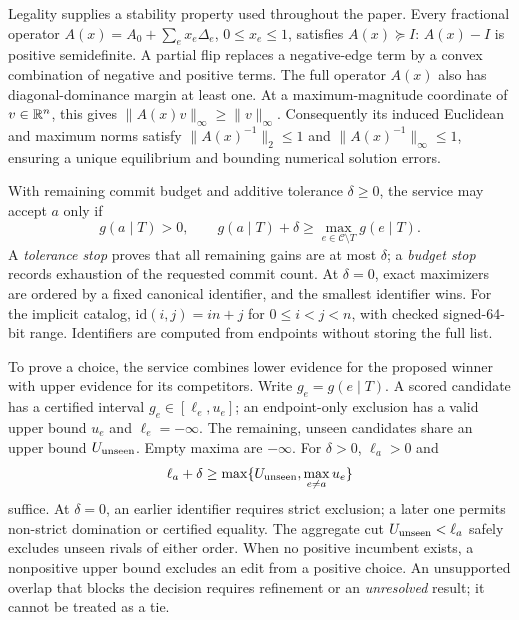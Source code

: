 Legality supplies a stability property used throughout the paper. Every fractional operator $A(x)=A_0+\sum_e x_e\Delta_e$, $0\le x_e\le1$, satisfies $A(x)\succeq I$: $A(x)-I$ is positive semidefinite. A partial flip replaces a negative-edge term by a convex combination of negative and positive terms. The full operator $A(x)$ also has diagonal-dominance margin at least one. At a maximum-magnitude coordinate of $v\in\mathbb R^n$, this gives $\|A(x)v\|_\infty\ge\|v\|_\infty$. Consequently its induced Euclidean and maximum norms satisfy $\|A(x)^{-1}\|_2\le1$ and $\|A(x)^{-1}\|_\infty\le1$, ensuring a unique equilibrium and bounding numerical solution errors.

With remaining commit budget and additive tolerance $\delta\ge0$, the service may accept $a$ only if
\begin{equation}
 g(a\mid T)>0,\qquad
 g(a\mid T)+\delta\ge\max_{e\in\mathcal C\setminus T}g(e\mid T).
 \label{eq:decision}
\end{equation}
A \emph{tolerance stop} proves that all remaining gains are at most $\delta$; a \emph{budget stop} records exhaustion of the requested commit count. At $\delta=0$, exact maximizers are ordered by a fixed canonical identifier, and the smallest identifier wins. For the implicit catalog, $\mathrm{id}(i,j)=in+j$ for $0\le i<j<n$, with checked signed-64-bit range. Identifiers are computed from endpoints without storing the full list.

To prove a choice, the service combines lower evidence for the proposed winner with upper evidence for its competitors. Write $g_e=g(e\mid T)$. A scored candidate has a certified interval $g_e\in[\ell_e,u_e]$; an endpoint-only exclusion has a valid upper bound $u_e$ and $\ell_e=-\infty$. The remaining, unseen candidates share an upper bound $U_{\rm unseen}$. Empty maxima are $-\infty$. For $\delta>0$, $\ell_a>0$ and
\begin{equation}
 \ell_a+\delta\ge\max\{U_{\rm unseen},\max_{e\ne a}u_e\}
 \label{eq:accept}
\end{equation}
suffice. At $\delta=0$, an earlier identifier requires strict exclusion; a later one permits non-strict domination or certified equality. The aggregate cut $U_{\rm unseen}<\ell_a$ safely excludes unseen rivals of either order. When no positive incumbent exists, a nonpositive upper bound excludes an edit from a positive choice. An unsupported overlap that blocks the decision requires refinement or an \emph{unresolved} result; it cannot be treated as a tie.

